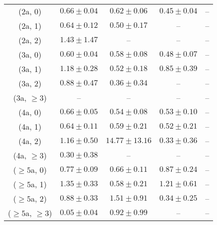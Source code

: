 \begin{table}[h!]
{\begin{tabular}{ccccc}
	(2a, 0) & $0.66\pm 0.04$ & $0.62\pm 0.06$ & $0.45\pm 0.04$ & -- \\[0.5ex] 
	(2a, 1) & $0.64\pm 0.12$ & $0.50\pm 0.17$ & -- & -- \\[0.5ex] 
	(2a, 2) & $1.43\pm 1.47$ & -- & -- & -- \\[0.5ex] 
	(3a, 0) & $0.60\pm 0.04$ & $0.58\pm 0.08$ & $0.48\pm 0.07$ & -- \\[0.5ex] 
	(3a, 1) & $1.18\pm 0.28$ & $0.52\pm 0.18$ & $0.85\pm 0.39$ & -- \\[0.5ex] 
	(3a, 2) & $0.88\pm 0.47$ & $0.36\pm 0.34$ & -- & -- \\[0.5ex] 
	(3a, $\ge3$) & -- & -- & -- & -- \\[0.5ex] 
	(4a, 0) & $0.66\pm 0.05$ & $0.54\pm 0.08$ & $0.53\pm 0.10$ & -- \\[0.5ex] 
	(4a, 1) & $0.64\pm 0.11$ & $0.59\pm 0.21$ & $0.52\pm 0.21$ & -- \\[0.5ex] 
	(4a, 2) & $1.16\pm 0.50$ & $14.77\pm 13.16$ & $0.33\pm 0.36$ & -- \\[0.5ex] 
	(4a, $\ge3$) & $0.30\pm 0.38$ & -- & -- & -- \\[0.5ex] 
	($\ge5$a, 0) & $0.77\pm 0.09$ & $0.66\pm 0.11$ & $0.87\pm 0.24$ & -- \\[0.5ex] 
	($\ge5$a, 1) & $1.35\pm 0.33$ & $0.58\pm 0.21$ & $1.21\pm 0.61$ & -- \\[0.5ex] 
	($\ge5$a, 2) & $0.88\pm 0.33$ & $1.51\pm 0.91$ & $0.34\pm 0.25$ & -- \\[0.5ex] 
	($\ge5$a, $\ge3$) & $0.05\pm 0.04$ & $0.92\pm 0.99$ & -- & -- \\[0.5ex] 
	\hline
	\hline
\end{tabular}}
\end{table}
